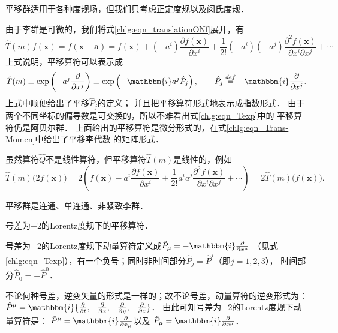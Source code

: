 平移群适用于各种度规场，但我们只考虑正定度规以及闵氏度规．

由于李群是可微的，我们将式\eqref{chlg:eqn_translationONf}展开，有
\begin{equation*}
    \hat{T}(m) f(\boldsymbol{x}) = f(\boldsymbol{x} - \boldsymbol{a}) 
    = f(\boldsymbol{x}) + (-a^i) \frac{\partial f(\boldsymbol{x})}{\partial x^i}
    +\frac{1}{2!} (-a^i)(-a^j) \frac{\partial^2 f(\boldsymbol{x})}{\partial x^i \partial x^j}
    +\cdots 
\end{equation*}
上式说明，平移算符可以表示成
\begin{equation}\label{chlg:eqn_Texp}
    \hat{T}(m) \equiv \exp\left( -a^j \frac{\partial }{\partial x^j} \right) 
    \equiv\exp\left(-\mathbbm{i} a^j \hat{P}_j  \right) , \qquad
    \hat{P}_j\overset{def}{=} -\mathbbm{i}\frac{\partial }{\partial x^j} .
\end{equation}
上式中顺便给出了平移$\hat{P}_j$的定义；
并且把平移算符形式地表示成指数形式．
由于两个不同坐标的偏导数是可交换的，所以不难看出式\eqref{chlg:eqn_Texp}中的
平移算符仍是阿贝尔群．
上面给出的平移算符是微分形式的，在式\eqref{chlg:eqn_Trans-Momen}中给出了平移李代数
的矩阵形式．

虽然算符$\hat{Q}$不是线性算符，但平移算符$\hat{T}(m)$是线性的，例如
\begin{equation*}
    \hat{T}(m) \bigl(2f(\boldsymbol{x})\bigr) 
    =2\left( f(\boldsymbol{x}) - a^i \frac{\partial f(\boldsymbol{x})}{\partial x^i}
    +\frac{1}{2!} a^i a^j \frac{\partial^2 f(\boldsymbol{x})}{\partial x^i \partial x^j}
    +\cdots \right) = 2 \hat{T}(m) \bigl(f(\boldsymbol{x})\bigr)  .
\end{equation*}

平移群是连通、单连通、非紧致李群．

\begin{example}\label{chlg:exam_pm2}
    号差为$-2$的Lorentz度规下的平移算符．
\end{example}
号差为$+2$的Lorentz度规下动量算符定义成$\hat{P}_\mu =- \mathbbm{i}\frac{\partial }{\partial x^\mu}$
（见式\eqref{chlg:eqn_Texp}），有一个负号；同时非时间部分$\hat{P}_j =\hat{P}^j$（即$j=1,2,3$），
时间部分$\hat{P}_0 =-\hat{P}^0$．

不论何种号差，逆变矢量的形式是一样的；故不论号差，动量算符的逆变形式为：
$\hat{P}^\mu=\mathbbm{i}\{\frac{\partial}{\partial t}, -\frac{\partial}{\partial x},
-\frac{\partial}{\partial y},-\frac{\partial}{\partial z}\}$．
由此可知号差为$-2$的Lorentz度规下动量算符是：
$\hat{P}^\mu = \mathbbm{i}\frac{\partial }{\partial x_\mu}$以及
$\hat{P}_\mu = \mathbbm{i}\frac{\partial }{\partial x^\mu}$．

